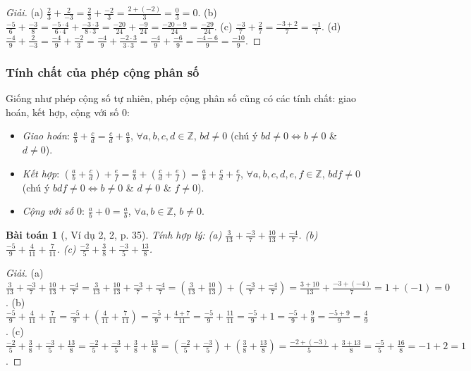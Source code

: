 \documentclass{article}
\newtheorem{baitoan}{Bài toán}
\begin{document}
\begin{proof}[Giải]
	(a) $\frac{2}{3} + \frac{2}{-3} = \frac{2}{3} + \frac{-2}{3} = \frac{2 + (-2)}{3} = \frac{0}{3} = 0$. (b) $\frac{-5}{6} + \frac{-3}{8} = \frac{-5\cdot4}{6\cdot4} + \frac{-3\cdot3}{8\cdot3} = \frac{-20}{24} + \frac{-9}{24} = \frac{-20 - 9}{24} = \frac{-29}{24}$. (c) $\frac{-3}{7} + \frac{2}{7} = \frac{-3 + 2}{7} = \frac{-1}{7}$. (d) $\frac{-4}{9} + \frac{2}{-3} = \frac{-4}{9} + \frac{-2}{3} = \frac{-4}{9} + \frac{-2\cdot3}{3\cdot3} = \frac{-4}{9} + \frac{-6}{9} = \frac{-4 - 6}{9} = \frac{-10}{9}$.
\end{proof}

\subsubsection{Tính chất của phép cộng phân số}
Giống như phép cộng số tự nhiên, phép cộng phân số cũng có các tính chất: giao hoán, kết hợp, cộng với số 0:
\begin{itemize}
	\item \textit{Giao hoán}: $\frac{a}{b} + \frac{c}{d} = \frac{c}{d} + \frac{a}{b}$, $\forall a,b,c,d\in\mathbb{Z}$, $bd\ne0$ (chú ý $bd\ne0\Leftrightarrow b\ne0$ \& $d\ne0$).
	\item \textit{Kết hợp}: $\left(\frac{a}{b} + \frac{c}{d}\right) + \frac{e}{f} = \frac{a}{b} + \left(\frac{c}{d} + \frac{e}{f}\right) = \frac{a}{b} + \frac{c}{d} + \frac{e}{f}$, $\forall a,b,c,d,e,f\in\mathbb{Z}$, $bdf\ne0$ (chú ý $bdf\ne0\Leftrightarrow b\ne0$ \& $d\ne0$ \& $f\ne0$).
	\item \textit{Cộng với số $0$}: $\frac{a}{b} + 0 = \frac{a}{b}$, $\forall a,b\in\mathbb{Z}$, $b\ne0$.
\end{itemize}

\begin{baitoan}[\cite{SGK_Toan_6_Canh_Dieu_tap_2}, Ví dụ 2, 2, p. 35]
	Tính hợp lý: (a) $\frac{3}{13} + \frac{-3}{7} + \frac{10}{13} + \frac{-4}{7}$. (b) $\frac{-5}{9} + \frac{4}{11} + \frac{7}{11}$. (c) $\frac{-2}{5} + \frac{3}{8} + \frac{-3}{5} + \frac{13}{8}$.
\end{baitoan}

\begin{proof}[Giải]
	(a) $\frac{3}{13} + \frac{-3}{7} + \frac{10}{13} + \frac{-4}{7} = \frac{3}{13} + \frac{10}{13} + \frac{-3}{7} + \frac{-4}{7} = \left(\frac{3}{13} + \frac{10}{13}\right) + \left(\frac{-3}{7} + \frac{-4}{7}\right) = \frac{3 + 10}{13} + \frac{-3 + (-4)}{7} = 1 + (-1) = 0$. (b) $\frac{-5}{9} + \frac{4}{11} + \frac{7}{11} = \frac{-5}{9} + \left(\frac{4}{11} + \frac{7}{11}\right) = \frac{-5}{9} + \frac{4 + 7}{11} = \frac{-5}{9} + \frac{11}{11} = \frac{-5}{9} + 1 = \frac{-5}{9} + \frac{9}{9} = \frac{-5 + 9}{9} = \frac{4}{9}$. (c) $\frac{-2}{5} + \frac{3}{8} + \frac{-3}{5} + \frac{13}{8} = \frac{-2}{5} + \frac{-3}{5} + \frac{3}{8} + \frac{13}{8} = \left(\frac{-2}{5} + \frac{-3}{5}\right) + \left(\frac{3}{8} + \frac{13}{8}\right) = \frac{-2 + (-3)}{5} + \frac{3 + 13}{8} = \frac{-5}{5} + \frac{16}{8} = -1 + 2 = 1$.
\end{proof}
\end{document}
